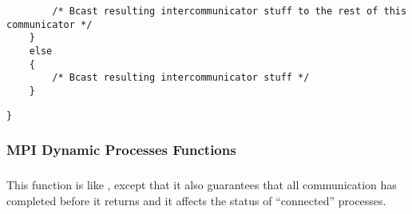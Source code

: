\documentclass{article}
\begin{document}
\begin{small}
\begin{verbatim}
        /* Bcast resulting intercommunicator stuff to the rest of this communicator */
    }
    else
    {
        /* Bcast resulting intercommunicator stuff */
    }
\end{verbatim}
%        
%
%        
%        
%        
%        
%        
\begin{verbatim}
}
\end{verbatim}
\end{small}


\subsubsection{MPI Dynamic Processes Functions }
\label{sec:spawn-impl}

\subsubsection{}


\subsubsection{}
This function is like , except that it also guarantees
that all communication has completed before it returns and it affects the
status of ``connected'' processes.
\end{document}
